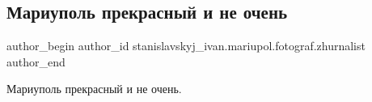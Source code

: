  
 
 
 
 

\subsection{Мариуполь прекрасный и не очень}
\label{sec:13_06_2017.fb.stanislavskyj_ivan.mariupol.fotograf.zhurnalist.1.mariupol_prekrasnyj_i_ne_ochen}

\ifcmt
 author_begin
   author_id stanislavskyj_ivan.mariupol.fotograf.zhurnalist
 author_end
\fi

Мариуполь прекрасный и не очень.
